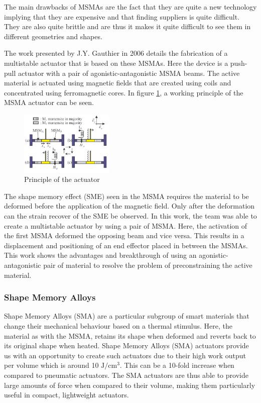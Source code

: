 The main drawbacks of MSMAs are the fact that they are quite a new technology implying that they are expensive and that finding suppliers is quite difficult. They are also quite brittle and are thus it makes it quite difficult to see them in different geometries and shapes.

The work presented by J.Y. Gauthier in 2006\cite{gauthier_multistable_2006} details the fabrication of a multistable actuator that is based on these MSMAs. Here the device is a push-pull actuator with a pair of agonistic-antagonistic MSMA beams. The active material is actuated using magnetic fields that are created using coils and concentrated using ferromagnetic cores. In figure \ref{fig:MSMA_princ}, a working principle of the MSMA actuator can be seen.
\begin{figure}[H]
	\centering
	\includegraphics[width=0.4\textwidth]{Figures/MSMA_princ.png}
	\caption{Principle of the actuator\cite{gauthier_multistable_2006}}
	\label{fig:MSMA_princ}
\end{figure}

The shape memory effect (SME) seen in the MSMA requires the material to be deformed before the application of the magnetic field. Only after the deformation can the strain recover of the SME be observed. In this work, the team was able to create a multistable actuator by using a pair of MSMA. Here, the activation of the first MSMA deformed the opposing beam and vice versa. This results in a displacement and positioning of an end effector placed in between the MSMAs. This work shows the advantages and breakthrough of using an agonistic-antagonistic pair of material to resolve the problem of preconstraining the active material.

\subsubsection{Shape Memory Alloys}
Shape Memory Alloys (SMA) are a particular subgroup of smart materials that change their mechanical behaviour based on a thermal stimulus. Here, the material as with the MSMA, retains its shape when deformed and reverts back to its original shape when heated. Shape Memory Alloys (SMA) actuators provide us with an opportunity to create such actuators due to their high work output per volume which is around 10 $\mathrm{J}/\mathrm{cm}^3$\cite{mohd_jani_review_2014}. This can be a 10-fold increase when compared to pneumatic actuators. The SMA actuators are thus able to provide large amounts of force when compared to their volume, making them particularly useful in compact, lightweight actuators.

